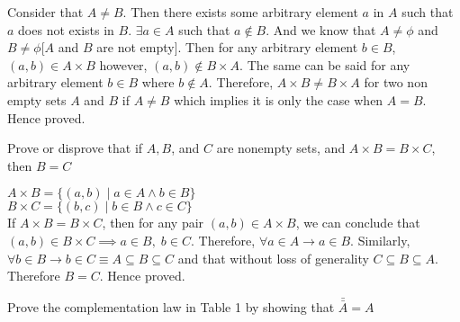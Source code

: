\documentclass[addpoints]{exam}
\newenvironment{problem}[2][Problem]{\begin{trivlist}
\item[\hskip \labelsep {\bfseries #1}\hskip \labelsep {\bfseries #2.}]}{\end{trivlist}}
\begin{document}
\begin{sloppypar}
    \begin{questions}
        \question
        \begin{solution}
            
            Consider that $ A \neq B $. Then there exists some arbitrary element $a$ in $A$ such that $a$ does not exists in $B$. $ \exists a \in A$ such that $a \notin B $. And we know that $ A \neq \phi $ and $ B \neq \phi $[$A$ and $B$ are not empty]. Then for any arbitrary element $b \in B$, $ (a, b) \in A \times B $ however, $ (a, b) \notin B \times A $. The same can be said for any arbitrary element $b \in B$ where $ b \notin A $. Therefore, $ A \times B \neq B \times A $ for two non empty sets $A$ and $B$ if $ A \neq B $ which implies it is only the case when $ A = B $. Hence proved.  
        \end{solution}
    \end{questions}

    \begin{problem}{9}[Chapter 2.1, Question 44]
    Prove or disprove that if $A,B$, and $C$ are nonempty sets, and $A \times B = B \times C$, then $B=C$
    \end{problem}

    \begin{questions}
        \question
        \begin{solution}
            

            $ A \times B = \{ (a, b) \; | \; a \in A \land b \in B \} $ \\ 
            $ B \times C = \{ (b, c) \; | \; b \in B \land c \in C \} $ \\
            If $ A \times B = B \times C $, then for any pair $ (a, b) \in A \times B $, we can conclude that $ (a, b) \in B \times C \implies a \in B, \; b \in C $. Therefore, $ \forall a \in A \rightarrow  a \in B $. Similarly, $ \forall b \in B \rightarrow b \in C \equiv A \subseteq B \subseteq C$ and that without loss of generality $ C \subseteq B \subseteq A $. Therefore $ B = C $. Hence proved.
        \end{solution}
    \end{questions}

    \begin{problem}{10}[Chapter 2.2, Question 5]
    Prove the complementation law in Table 1 by showing that $ \bar{\bar{A}} = A$
    \end{problem}

    \begin{questions}
        \question
        \begin{solution}
            

\end{solution}
\end{questions}
\end{sloppypar}
\end{document}
